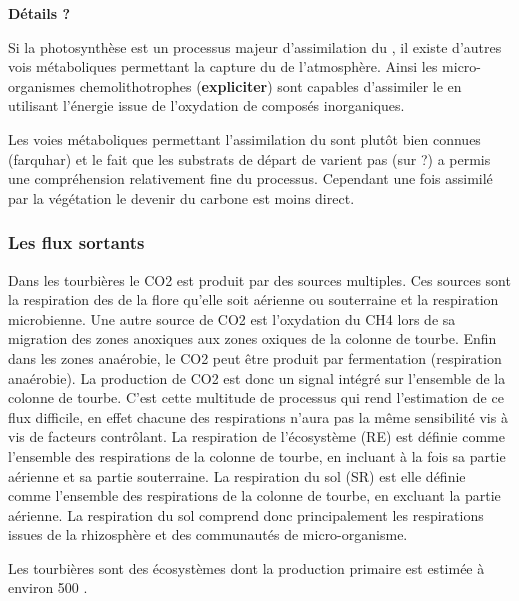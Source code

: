 \textbf{Détails ?}

Si la photosynthèse est un processus majeur d'assimilation du \COO, il existe d'autres vois métaboliques permettant la capture du \COO de l'atmosphère.
Ainsi les micro-organismes chemolithotrophes (\textbf{expliciter}) sont capables d'assimiler le \COO en utilisant l'énergie issue de l'oxydation de composés inorganiques.

Les voies métaboliques permettant l'assimilation du \COO sont plutôt bien connues (farquhar) et le fait que les substrats de départ de varient pas (sur ?) a permis une compréhension relativement fine du processus.
Cependant une fois assimilé par la végétation le devenir du carbone est moins direct.

\subsubsection{Les flux sortants}
Dans les tourbières le CO2 est produit par des sources multiples.
Ces sources sont la respiration des de la flore qu'elle soit aérienne ou souterraine et la respiration microbienne.
Une autre source de CO2 est l'oxydation du CH4 lors de sa migration des zones anoxiques aux zones oxiques de la colonne de tourbe.
Enfin dans les zones anaérobie, le CO2 peut être produit par fermentation (respiration anaérobie).
La production de CO2 est donc un signal intégré sur l'ensemble de la colonne de tourbe. 
C'est cette multitude de processus qui rend l'estimation de ce flux difficile, en effet chacune des respirations n'aura pas la même sensibilité vis à vis de facteurs contrôlant.
La respiration de l'écosystème (RE) est définie comme l'ensemble des respirations de la colonne de tourbe, en incluant à la fois sa partie aérienne et sa partie souterraine.
La respiration du sol (SR) est elle définie comme l'ensemble des respirations de la colonne de tourbe, en excluant la partie aérienne.
La respiration du sol comprend donc principalement les respirations issues de la rhizosphère et des communautés de micro-organisme.

Les tourbières sont des écosystèmes dont la production primaire est estimée à environ \SI{500}{\gcm} \cite{francez2000}. 


